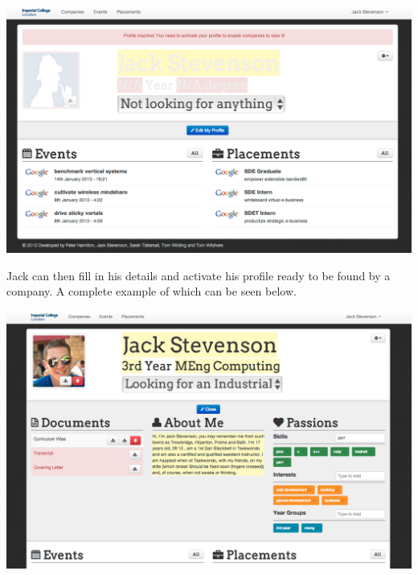     \begin{center}
    \includegraphics[scale=0.3]{images/user_experiences/student/sign_up_deactivate}
    \end{center}

    Jack can then fill in his details and activate his profile ready to be found by a company.
    A complete example of which can be seen below.

    \includegraphics[scale=0.3]{images/user_experiences/student/edit_complete}

